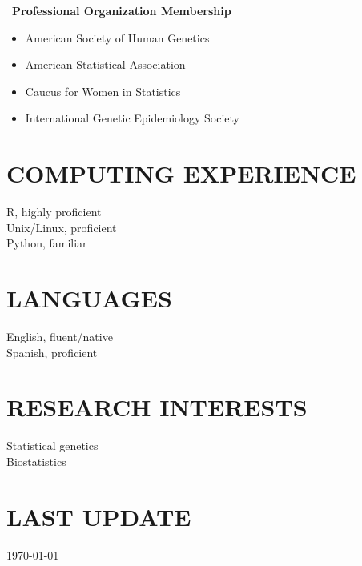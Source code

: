 \documentclass[margin]{res}
\begin{document}
\begin{resume}
	\ \textbf{Professional Organization Membership} 
	\begin{itemize}	 \itemsep -2pt
	\item American Society of Human Genetics 
	\item American Statistical Association
	\item Caucus for Women in Statistics
	\item International Genetic Epidemiology Society 
	\end{itemize}

\section{COMPUTING EXPERIENCE} R, highly proficient \\
							Unix/Linux, proficient \\
							Python, familiar \\
		

\section{LANGUAGES} English, fluent/native \\
					Spanish, proficient\\

\section{RESEARCH INTERESTS} Statistical genetics \\
							 Biostatistics \\
			
\section{LAST UPDATE} \today

\end{resume}
\end{document}
